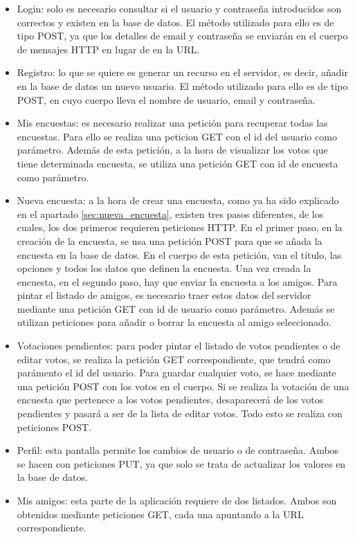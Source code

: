 \documentclass[a4paper, 12pt]{book}
\begin{document}
\begin{itemize}
\item Login: 
solo es necesario consultar si el usuario y contrase\~na introducidos son correctos y existen en la base de datos. El m\'etodo utilizado para ello es de tipo POST, ya que los detalles de email y contrase\~na se enviar\'an en el cuerpo de mensajes HTTP en lugar de en la URL.

\item Registro:
lo que se quiere es generar un recurso en el servidor, es decir, a\~nadir en la base de datos un nuevo usuario. El m\'etodo utilizado para ello es de tipo POST, en cuyo cuerpo lleva el nombre de usuario, email y contrase\~na.

\item Mis encuestas:
es necesario realizar una petici\'on para recuperar todas las encuestas. Para ello se realiza una peticion GET con el id del usuario como par\'ametro. Adem\'as de esta petici\'on, a la hora de visualizar los votos que tiene determinada encuesta, se utiliza una petici\'on GET con id de encuesta como par\'ametro.

\item Nueva encuesta:
a la hora de crear una encuesta, como ya ha sido explicado en el apartado \ref{sec:nueva_encuesta}, existen tres pasos diferentes, de los cuales, los dos primeros requieren peticiones HTTP. 
En el primer paso, en la creaci\'on de la encuesta, se usa una petici\'on POST para que se a\~nada la encuesta en la base de datos. En el cuerpo de esta petici\'on, van el t\'itulo, las opciones y todos los datos que definen la encuesta. 
Una vez creada la encuesta, en el segundo paso, hay que enviar la encuesta a los amigos. Para pintar el listado de amigos, es necesario traer estos datos del servidor mediante una petici\'on GET con id de usuario como par\'ametro. Adem\'as se utilizan peticiones para a\~nadir o borrar la encuesta al amigo seleccionado.

\item Votaciones pendientes: 
para poder pintar el listado de votos pendientes o de editar votos, se realiza la petici\'on GET correspondiente, que tendr\'a como par\'amento el id del usuario. Para guardar cualquier voto, se hace mediante una petici\'on POST con los votos en el cuerpo.
Si se realiza la votaci\'on de una encuesta que pertenece a los votos pendientes, desaparecer\'a de los votos pendientes y pasar\'a a ser de la lista de editar votos. Todo esto se realiza con peticiones POST.

\item Perfil:
esta pantalla permite los cambios de usuario o de contrase\~na. Ambos se hacen con peticiones PUT, ya que solo se trata de actualizar los valores en la base de datos.

\item Mis amigos:
esta parte de la aplicaci\'on requiere de dos listados. Ambos son obtenidos mediante peticiones GET, cada una apuntando a la URL correspondiente.

\end{itemize}
\end{document}
